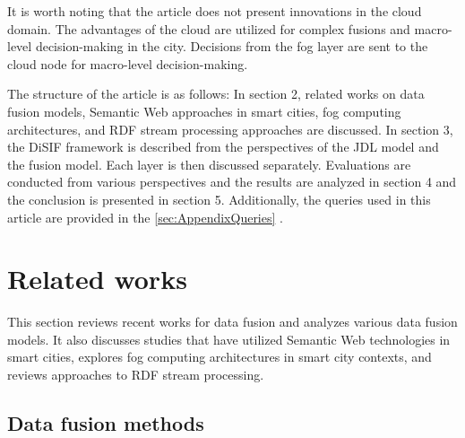 \documentclass[5p,times]{elsarticle}
\begin{document}
It is worth noting that the article does not present innovations in the cloud domain. The advantages of the cloud are utilized for complex fusions and macro-level decision-making in the city. Decisions from the fog layer are sent to the cloud node for macro-level decision-making.


The structure of the article is as follows: In section 2, related works on data fusion models, Semantic Web approaches
 in smart cities, fog computing architectures, and RDF stream processing approaches are discussed. In section 3, the DiSIF framework is described from the perspectives of the JDL model and the fusion model. Each layer is then discussed separately. Evaluations are conducted from various perspectives and the results are analyzed in section 4 and the conclusion is presented in section 5. Additionally, 
the queries used in this article are provided in the \ref{sec:AppendixQueries} .
\section{Related works}
This section reviews recent works for data fusion and analyzes various data fusion models. It also discusses studies that have utilized Semantic Web technologies in smart cities, explores fog computing architectures in smart city contexts, and reviews approaches to RDF stream processing.


\subsection{Data fusion methods}


\end{document}
